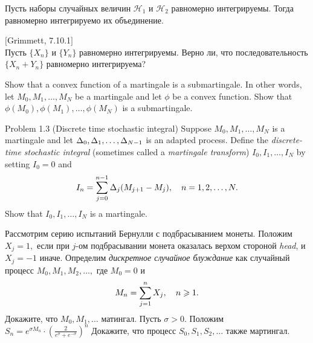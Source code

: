 \begin{problem}
Пусть наборы случайных величин $\mathcal{H}_{1}$ и
$\mathcal{H}_{2}$ равномерно интегрируемы.
Тогда равномерно интегрируемо их объединение.

\begin{sol}

\end{sol}
\end{problem}

\begin{problem}
 $[$Grimmett, 7.10.1$]$\\
 Пусть $\{X_{n}\}$ и $\{Y_{n}\}$ равномерно
интегрируемы. Верно ли, что последовательность $\{X_{n}+Y_{n}\}$
равномерно интегрируема?

\begin{sol}

\end{sol}
\end{problem}

\begin{problem}
 Show that a convex function of a martingale is a submartingale.
In other words, let $M_0,M_1,\dots,M_N$ be a martingale and let $\phi$ be a convex function.
Show that $\phi(M_0),\phi(M_1),\dots,\phi(M_N)$ is a submartingale.

\begin{sol}

\end{sol}
\end{problem}

\begin{problem}
Problem 1.3 (Discrete time stochastic integral) Suppose $M_0,M_1,\dots,M_N$
is a martingale and let $\Delta_0,\Delta_1,\dots,\Delta_{N-1}$ is an adapted process. Define the
\emph{discrete-time stochastic integral} (sometimes called a \emph{martingale transform})
$I_0,I_1,\dots,I_N$ by setting $I_0=0$ and
\[
I_n=\sum\limits_{j=0}^{n-1} \Delta_j (M_{j+1}-M_j),\quad n=1,2,\dots,N.
\]
\ni Show that $I_0,I_1,\dots,I_N$ is a martingale.

\begin{sol}

\end{sol}
\end{problem}

\begin{problem}
 Рассмотрим серию испытаний Бернулли с подбрасыванием монеты. Положим $X_j=1,$
  если при $j$-ом подбрасывании монета оказалась верхом стороной \emph{head}, и
  $X_j=-1$ иначе. Определим \emph{дискретное случайное блуждание} как
  случайный процесс $M_0,M_1,M_2,\dots,$ где $M_0=0$ и
\[
  M_n=\sum\limits_{j=1}^{n} X_j,\quad n\geqslant 1.
\]
  \ni Докажите, что $M_0,M_1,\dots$ матингал. Пусть $\sigma>0.$
  Положим $S_n=e^{\sigma M_n}\cdot\left(\frac{2}{e^{\sigma}+e^{-\sigma}} \right)^n$
  \ni Докажите, что процесс $S_0,S_1,S_2,\dots$ также мартингал.

\begin{sol}

\end{sol}
\end{problem}

